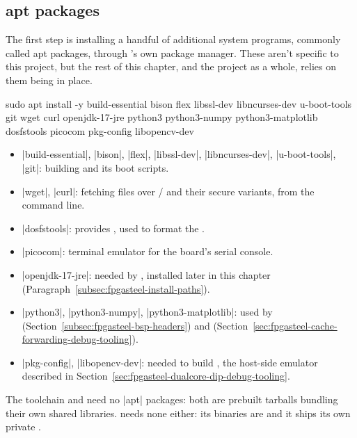 \subsection{apt packages}
\label{subsec:fpgasteel-apt-packages}

The first step is installing a handful of additional  system programs, commonly called apt packages, through 's own package manager. These aren't specific to this project, but the rest of this chapter, and the project as a whole, relies on them being in place.

\begin{shellcodehost}
sudo apt install -y build-essential bison flex libssl-dev libncurses-dev u-boot-tools git wget curl openjdk-17-jre python3 python3-numpy python3-matplotlib dosfstools picocom pkg-config libopencv-dev
\end{shellcodehost}

\begin{itemize} 
    \item |build-essential|, |bison|, |flex|, |libssl-dev|, |libncurses-dev|, |u-boot-tools|, |git|: building  and its boot scripts.
    \item |wget|, |curl|: fetching files over / and their secure variants, from the command line.
    \item |dosfstools|: provides , used to format the .
    \item |picocom|: terminal emulator for the board's serial console.
    \item |openjdk-17-jre|: needed by , installed later in this chapter (Paragraph~\ref{subsec:fpgasteel-install-paths}).
    \item |python3|, |python3-numpy|, |python3-matplotlib|: used by  (Section~\ref{subsec:fpgasteel-bsp-headers}) and  (Section~\ref{sec:fpgasteel-cache-forwarding-debug-tooling}).
    \item |pkg-config|, |libopencv-dev|: needed to build , the host-side emulator described in Section~\ref{sec:fpgasteel-dualcore-dip-debug-tooling}.
\end{itemize}

The  toolchain and  need no |apt| packages: both are prebuilt  tarballs bundling their own shared libraries.  needs none either: its binaries are  and it ships its own private .

